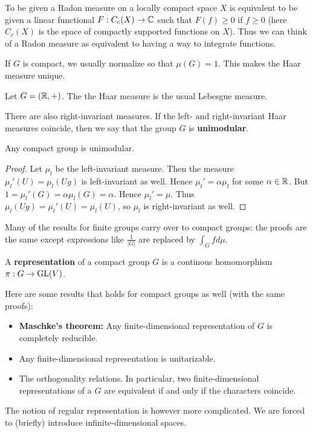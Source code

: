 \documentclass[11pt, english]{article}
\begin{document}
To be given a Radon measure on a locally compact space $X$ is equivalent to be given a linear functional $F:C_c(X) \to \mathbb{C}$ such that $F(f) \geq 0$ if $f \geq 0$ (here $C_c(X)$ is the space of compactly supported functions on $X$). Thus we can think of a Radon measure as equivalent to having a way to integrate functions.

If $G$ is compact, we usually normalize so that $\mu(G)=1$. This makes the Haar measure unique.

\begin{example}
  Let $G=(\mathbb{R},+)$. The the Haar measure is the usual Lebesgue measure.
\end{example}

There are also right-invariant measures. If the left- and right-invariant Haar measures coincide, then we say that the group $G$ is \textbf{unimodular}.

\begin{lemma}
Any compact group is unimodular.  
\end{lemma}
\begin{proof}
 Let $\mu_l$ be the left-invariant measure. Then the measure $\mu_l'(U)= \mu_l(Ug)$ is left-invariant as well. Hence $\mu_l' = \alpha \mu_l$ for some $\alpha \in \mathbb{R}$. But $1=\mu_l'(G) = \alpha \mu_l(G) = \alpha$. Hence $\mu_l'=\mu$.
Thus $\mu_l(Ug)=\mu_l'(U)=\mu_l(U)$, so $\mu_l$ is right-invariant as well.
\end{proof}

Many of the results for finite groups carry over to compact groups: the proofs are the same except expressions like $\frac{1}{\lvert G \rvert}$ are replaced by $\int_G f d \mu$.

A \textbf{representation} of a compact group $G$ is a continous homomorphism $\pi:G \to \operatorname{GL}(V)$.

Here are some results that holds for compact groups as well (with the same proofs):
\begin{itemize}
\item \textbf{Maschke's theorem:} Any finite-dimensional representation of $G$ is completely reducible.
\item Any finite-dimensional representation is unitarizable.
\item The orthogonality relations. In particular, two finite-dimensional representations of a $G$ are equivalent if and only if the characters coincide. 
\end{itemize}

The notion of regular representation is however more complicated. We are forced to (briefly) introduce infinite-dimensional spaces.
\end{document}

